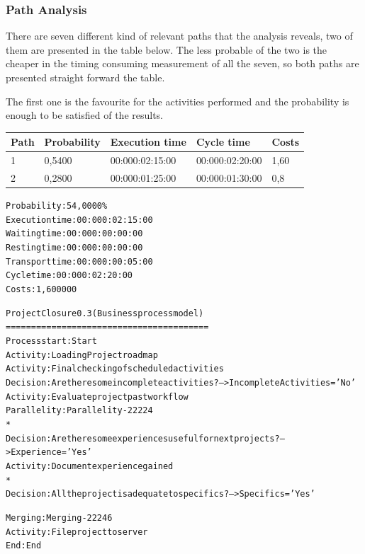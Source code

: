 \subsubsection{Path Analysis}
There are seven different kind of relevant paths that the analysis reveals, two of them are presented in the table below. The less probable of the two is the cheaper in the timing consuming measurement of all the seven, so both paths are presented straight forward the table.

The first one is the favourite for the activities performed and the probability is enough to be satisfied of the results.

\begin{table}[ht!]
\centering
\begin{tabular}{|l|l|l|l|l|}
\hline
Path&Probability&Execution time&Cycle time&Costs\\
\hline
1&0,5400&00:000:02:15:00&00:000:02:20:00&1,60\\
\hline
2&0,2800&00:000:01:25:00&00:000:01:30:00&0,8\\
\hline
\end{tabular}
\end{table}

\begin{alltt}
Probability:   54,0000\%
Execution time:  00:000:02:15:00
Waiting time:  00:000:00:00:00
Resting time:  00:000:00:00:00
Transport time:  00:000:00:05:00
Cycle time:  00:000:02:20:00
Costs:  1,600000

Project Closure 0.3 (Business process model)
========================================
Process start: Start
Activity: Loading Project roadmap
Activity: Final checking of scheduled activities
Decision: Are there some incomplete activities ? --> IncompleteActivities='No'
Activity: Evaluate project past workflow
Parallelity: Parallelity-22224
    *
    Decision: Are there some experiences useful for next projects? --> Experience='Yes'
    Activity: Document experience gained
    *
    Decision: All the project is adequate to specifics? --> Specifics='Yes'

Merging: Merging-22246
Activity: File project to server
End: End
\end{alltt}

